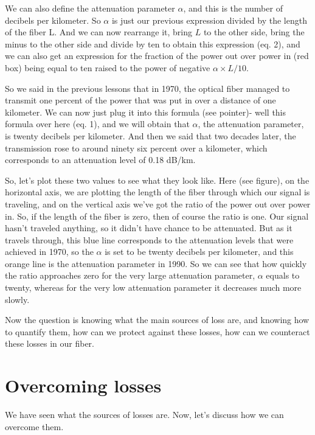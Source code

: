 We can also define the attenuation parameter $\alpha$, and this is the number of decibels per kilometer. So $\alpha$ is just our previous expression divided by the length of the fiber L. And we can now rearrange it, bring $L$ to the other side, bring the minus to the other side and divide by ten to obtain this expression (eq. 2), and we can also get an expression for the fraction of the power out over power in (red box) being equal to ten raised to the power of negative $\alpha \times L / 10$.

So we said in the previous lessons that in 1970, the optical fiber managed to transmit one percent of the power that was put in over a distance of one kilometer. We can now just plug it into this formula (see pointer)- well this formula over here (eq. 1), and we will obtain that $\alpha$, the attenuation parameter, is twenty decibels per kilometer. And then we said that two decades later, the transmission rose to around ninety six percent over a kilometer, which corresponds to an attenuation level of 0.18 dB/km.

So, let's plot these two values to see what they look like. Here (see figure), on the horizontal axis, we are plotting the length of the fiber through which our signal is traveling, and on the vertical axis we've got the ratio of the power out over power in. So, if the length of the fiber is zero, then of course the ratio is one. Our signal hasn't traveled anything, so it didn't have chance to be attenuated. But as it travels through, this blue line corresponds to the attenuation levels that were achieved in 1970, so the $\alpha$ is set to be twenty decibels per kilometer, and this orange line is the attenuation parameter in 1990. So we can see that how quickly the ratio approaches zero for the very large attenuation parameter, $\alpha$ equals to twenty, whereas for the very low attenuation parameter it decreases much more slowly.

Now the question is knowing what the main sources of loss are, and knowing how to quantify them, how can we protect against these losses, how can we counteract these losses in our fiber.



\section{Overcoming losses}
\label{sec:11-4_overcoming_losses}

We have seen what the sources of losses are. Now, let's discuss how we can overcome them.

